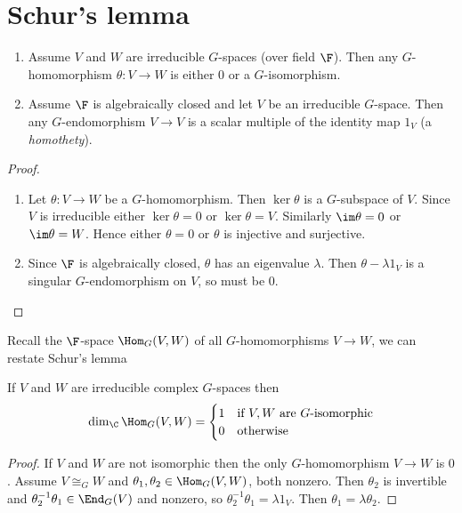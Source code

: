 \documentclass[a4paper]{article}
\theoremstyle{definition}
\begin{document}
\section{Schur's lemma}

\begin{theorem}\leavevmode
  \begin{enumerate}
  \item Assume \(V\) and \(W\) are irreducible \(G\)-spaces (over field \(\F\)). Then any \(G\)-homomorphism \(\theta: V \to W\) is either \(0\) or a \(G\)-isomorphism.
  \item Assume \(\F\) is algebraically closed and let \(V\) be an irreducible \(G\)-space. Then any \(G\)-endomorphism \(V \to V\) is a scalar multiple of the identity map \(1_V\) (a \emph{homothety}).
  \end{enumerate}
\end{theorem}

\begin{proof}\leavevmode
  \begin{enumerate}
  \item Let \(\theta: V \to W\) be a \(G\)-homomorphism. Then \(\ker \theta\) is a \(G\)-subspace of \(V\). Since \(V\) is irreducible either \(\ker \theta = 0\) or \(\ker \theta = V\). Similarly \(\im \theta = 0\) or \(\im \theta = W\). Hence either \(\theta = 0\) or \(\theta\) is injective and surjective.
  \item Since \(\F\) is algebraically closed, \(\theta\) has an eigenvalue \(\lambda\). Then \(\theta - \lambda 1_V\) is a singular \(G\)-endomorphism on \(V\), so must be \(0\).
  \end{enumerate}
\end{proof}

Recall the \(\F\)-space \(\Hom_G(V, W)\) of all \(G\)-homomorphisms \(V \to W\), we can restate Schur's lemma
\begin{corollary}
  If \(V\) and \(W\) are irreducible complex \(G\)-spaces then
  \[
    \dim_\C \Hom_G(V, W) =
    \begin{cases}
      1 & \text{if \(V, W\) are \(G\)-isomorphic} \\
      0 & \text{otherwise}
    \end{cases}
  \]
\end{corollary}

\begin{proof}
  If \(V\) and \(W\) are not isomorphic then the only \(G\)-homomorphism \(V \to W\) is \(0\). Assume \(V \cong_G W\) and \(\theta_1, \theta_2 \in \Hom_G(V, W)\), both nonzero. Then \(\theta_2\) is invertible and \(\theta_2^{-1}\theta_1 \in \End_G(V)\) and nonzero, so \(\theta_2^{-1}\theta_1 = \lambda 1_V\). Then \(\theta_1 = \lambda \theta_2\).
\end{proof}
\end{document}
